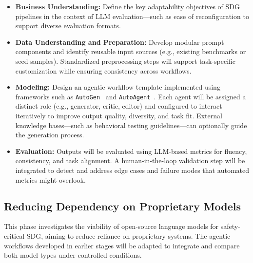 \documentclass[12pt,a4paper]{article}
\begin{document}
\begin{itemize}
    \item \textbf{Business Understanding:}  
    Define the key adaptability objectives of SDG pipelines in the context of LLM evaluation—such as ease of reconfiguration to support diverse evaluation formats.

    \item \textbf{Data Understanding and Preparation:}  
    Develop modular prompt components and identify reusable input sources (e.g., existing benchmarks or seed samples). Standardized preprocessing steps will support task-specific customization while ensuring consistency across workflows.

    \item \textbf{Modeling:}  
    Design an agentic workflow template implemented using frameworks such as \texttt{AutoGen}~\cite{agents-r7} and \texttt{AutoAgent}~\cite{AutoAgent}. Each agent will be assigned a distinct role (e.g., generator, critic, editor) and configured to interact iteratively to improve output quality, diversity, and task fit. External knowledge bases—such as behavioral testing guidelines—can optionally guide the generation process. 

    \item \textbf{Evaluation:}  
    Outputs will be evaluated using LLM-based metrics for fluency, consistency, and task alignment. A human-in-the-loop validation step will be integrated to detect and address edge cases and failure modes that automated metrics might overlook.
\end{itemize}


\subsection{Reducing Dependency on Proprietary Models}

This phase investigates the viability of open-source language models for safety-critical SDG, aiming to reduce reliance on proprietary systems. The agentic workflows developed in earlier stages will be adapted to integrate and compare both model types under controlled conditions.
\end{document}
